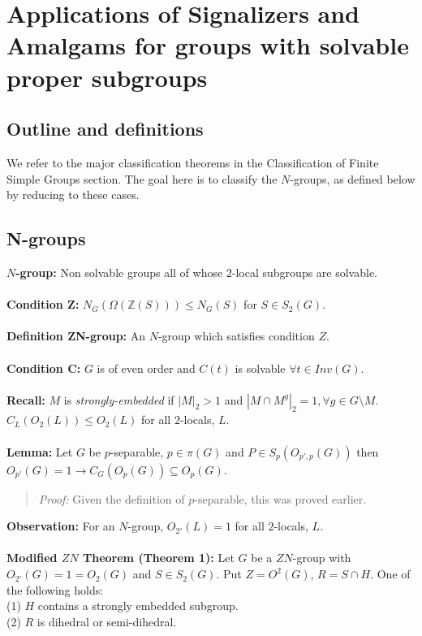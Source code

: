 \chapter{Applications of Signalizers and Amalgams for groups with solvable proper subgroups}
\section {Outline and definitions}
We refer to the major classification theorems in the Classiﬁcation of Finite Simple Groups section.  The
goal here is to classify the $N$-groups, as defined below by reducing to these cases.
\section {N-groups}
{\bf $N$-group:}  Non solvable groups all of whose $2$-local subgroups are solvable.
\\
\\
{\bf Condition Z:}  $N_G(\Omega({\mathbb Z}(S))) \le N_G(S)$ for $S \in S_2(G)$.
\\
\\
{\bf Definition ZN-group:} An $N$-group which satisfies condition $Z$.
\\
\\
{\bf Condition {\cal C}:}  $G$ is of even order and $C(t)$ is solvable $\forall t \in Inv(G)$.
\\
\\
{\bf Recall:}  $M$ is \emph{strongly-embedded} if
$|M|_2 > 1$ and $|M \cap M^g|_2=1, \forall g \in G \setminus M$.  $C_L(O_2(L)) \le O_2(L)$ for all
$2$-locals, $L$.
\\
\\
{\bf Lemma:} Let $G$ be $p$-separable, $p \in \pi(G)$ and $P \in S_p(O_{p', p}(G))$ then
$O_{p'}(G)=1 \rightarrow C_G(O_p(G)) \subseteq O_p(G)$.
\begin{quote}
\emph{Proof:}
Given the definition of $p$-separable, this was proved earlier.
\end{quote}
{\bf Observation:} For an $N$-group, $O_{2'}(L)=1$ for all $2$-locals, $L$.
\\
\\
{\bf Modified $ZN$ Theorem (Theorem 1):}  Let $G$ be a $ZN$-group
with $O_{2'}(G)=1=O_2(G)$ and $S \in S_2(G)$.  Put
$Z= O^2(G)$, $R= S \cap H$.  One of the following holds:\\
(1) $H$ contains a strongly embedded subgroup.\\
(2) $R$ is dihedral or semi-dihedral.\\
